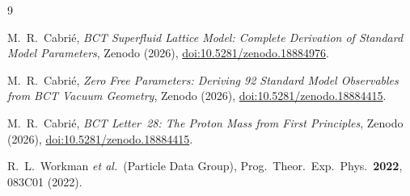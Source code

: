 \documentclass[twocolumn,10pt,a4paper]{article}
\begin{document}
\begin{thebibliography}{9}

M.~R.\ Cabri\'e,
\textit{BCT Superfluid Lattice Model: Complete Derivation of Standard Model
Parameters},
Zenodo (2026), \href{https://doi.org/10.5281/zenodo.18884976}{doi:10.5281/zenodo.18884976}.

M.~R.\ Cabri\'e,
\textit{Zero Free Parameters: Deriving 92 Standard Model Observables from
BCT Vacuum Geometry},
Zenodo (2026), \href{https://doi.org/10.5281/zenodo.18884415}{doi:10.5281/zenodo.18884415}.

M.~R.\ Cabri\'e,
\textit{BCT Letter~28: The Proton Mass from First Principles},
Zenodo (2026), \href{https://doi.org/10.5281/zenodo.18884415}{doi:10.5281/zenodo.18884415}.

R.~L.\ Workman \textit{et al.}\ (Particle Data Group),
Prog.\ Theor.\ Exp.\ Phys.\ \textbf{2022}, 083C01 (2022).

\end{thebibliography}
\end{document}
